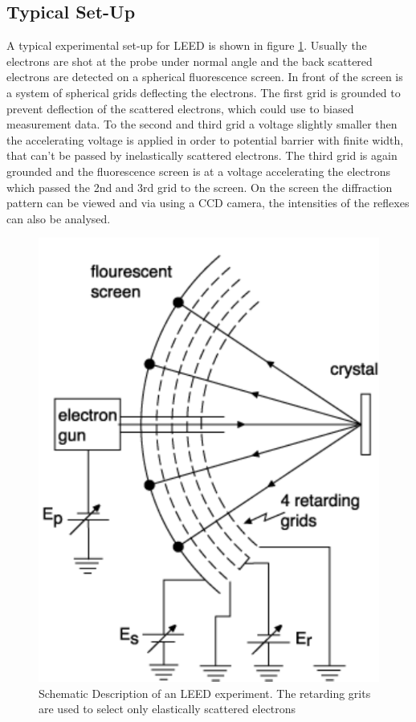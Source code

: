 \documentclass[a4paper]{scrartcl}
\numberwithin{equation}{section}
\numberwithin{figure}{section}
\numberwithin{table}{section}
\begin{document}
\subsection{Typical Set-Up}
A typical experimental set-up for LEED is shown in figure \ref{fig:leed}. Usually the electrons are shot at the probe under normal angle and the back scattered electrons are detected on a spherical fluorescence screen. In front of the screen is a system of spherical grids deflecting the electrons. The first grid is grounded to prevent deflection of the scattered electrons, which could use to biased measurement data. To the second and third grid a voltage slightly smaller then the accelerating voltage is applied in order to potential barrier with finite width, that can't be passed by inelastically scattered electrons. The third grid is again grounded and the fluorescence screen is at a voltage accelerating the electrons which passed the 2nd and 3rd grid to the screen. On the screen the diffraction pattern can be viewed and via using a CCD camera, the intensities of the reflexes can also be analysed.

\begin{figure}
  \centering
   	\includegraphics[width=0.3\linewidth]{pic/leed.pdf}

 \caption{\small Schematic Description of an LEED experiment. The retarding grits are used to select only elastically scattered electrons}
        \label{fig:leed}
\end{figure}



 

\end{document}
